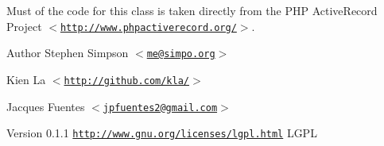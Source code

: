 Must of the code for this class is taken directly from the PHP ActiveRecord Project $<$\href{http://www.phpactiverecord.org/}{\tt http://www.phpactiverecord.org/}$>$.

\begin{DoxyAuthor}{Author}
Stephen Simpson $<$\href{mailto:me@simpo.org}{\tt me@simpo.org}$>$ 

Kien La $<$\href{http://github.com/kla/}{\tt http://github.com/kla/}$>$ 

Jacques Fuentes $<$\href{mailto:jpfuentes2@gmail.com}{\tt jpfuentes2@gmail.com}$>$ 
\end{DoxyAuthor}
\begin{DoxyVersion}{Version}
0.1.1  \href{http://www.gnu.org/licenses/lgpl.html}{\tt http://www.gnu.org/licenses/lgpl.html} LGPL 
\end{DoxyVersion}
